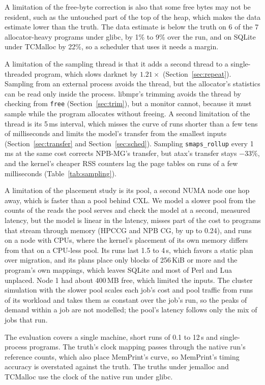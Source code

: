 \documentclass[11pt]{article}
\newcommand{\memprint}{MemPrint}
\newcommand{\secref}[1]{Section~\ref{#1}}
\newcommand{\tabref}[1]{Table~\ref{#1}}
\begin{document}
A limitation of the free-byte correction is also that some free bytes may not be resident, such as the untouched part
of the top of the heap, which makes the data estimate lower than the truth. The data estimate is below the truth on 6
of the 7 allocator-heavy programs under glibc, by 1\% to 9\% over the run, and on SQLite under TCMalloc by 22\%, so a
scheduler that uses it needs a margin.

A limitation of the sampling thread is that it adds a second thread to a single-threaded program, which slows darknet
by $1.21\times$ (\secref{sec:repeat}). Sampling from an external process avoids the thread, but the allocator's
statistics can be read only inside the process. libmpr's trimming avoids the thread by checking from \texttt{free}
(\secref{sec:trim}), but a monitor cannot, because it must sample while the program allocates without freeing. A second limitation of the thread is its 5\,ms interval, which misses
the curve of runs shorter than a few tens of milliseconds and limits the model's transfer from the smallest inputs
(\secref{sec:transfer} and \secref{sec:sched}). Sampling \texttt{smaps\_rollup} every 1\,ms at the same cost corrects
NPB-MG's transfer, but atax's transfer stays $-33\%$, and the kernel's cheaper RSS counters lag the page tables on runs
of a few milliseconds (\tabref{tab:sampling}).

A limitation of the placement study is its pool, a second NUMA node one hop away, which is faster than a pool
behind CXL. We model a slower pool from the counts of the reads the pool serves and check the model at a second,
measured latency, but the model is linear in the latency, misses part of the cost to programs that stream through
memory (HPCCG and NPB CG, by up to 0.24), and runs on a node
with CPUs, where the kernel's placement of its own memory differs from that on a CPU-less pool. Its runs last
1.5 to 4\,s, which favors a static plan over migration, and its plans place only blocks of 256\,KiB or more and the
program's own mappings, which leaves SQLite and most of Perl and Lua unplaced. Node 1 had about 400\,MB free, which
limited the inputs. The cluster simulation with the slower pool scales each job's cost and pool traffic from runs of
its workload and takes them as constant over the job's run, so the peaks of demand within a job are not modelled;
the pool's latency follows only the mix of jobs that run.

The evaluation covers a single machine, short runs of 0.1 to 12\,s and single-process programs. The truth's clock
mapping passes through the native run's reference counts, which also place \memprint{}'s curve, so \memprint{}'s timing
accuracy is overstated against the truth. The truths under jemalloc and TCMalloc use the clock of the native run under
glibc.
\end{document}
